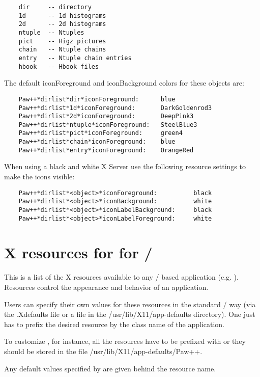 \begin{verbatim}
    dir     -- directory
    1d      -- 1d histograms
    2d      -- 2d histograms
    ntuple  -- Ntuples
    pict    -- Higz pictures
    chain   -- Ntuple chains
    entry   -- Ntuple chain entries
    hbook   -- Hbook files
\end{verbatim}

   The default iconForeground and iconBackground colors for these objects are:

\begin{verbatim}
    Paw++*dirlist*dir*iconForeground:      blue
    Paw++*dirlist*1d*iconForeground:       DarkGoldenrod3
    Paw++*dirlist*2d*iconForeground:       DeepPink3
    Paw++*dirlist*ntuple*iconForeground:   SteelBlue3
    Paw++*dirlist*pict*iconForeground:     green4
    Paw++*dirlist*chain*iconForeground:    blue
    Paw++*dirlist*entry*iconForeground:    OrangeRed
\end{verbatim}

   When using a black and white X Server use the following resource settings
   to make the icons visible:

\begin{verbatim}
    Paw++*dirlist*<object>*iconForeground:          black
    Paw++*dirlist*<object>*iconBackground:          white
    Paw++*dirlist*<object>*iconLabelBackground:     black
    Paw++*dirlist*<object>*iconLabelForeground:     white
\end{verbatim}

\section{X resources for for \KUIP/\MOTIF}

   This is a list of the X resources available to any \KUIP/\MOTIF{} based
   application (e.g. \PAWPP).  Resources control the appearance and behavior of
   an application.

   Users can specify their own values for these resources in the standard
   \Xxi/\MOTIF{} way (via the .Xdefaults file or a file in the
   /usr/lib/X11/app-defaults directory). One just has to prefix the desired
   resource by the class name of the application.

   To customize \PAWPP, for instance, all the resources have to be prefixed
   with  or they should be stored in the file
   /usr/lib/X11/app-defaults/Paw++.

   Any default values specified by \KUIP{} are given behind the resource name.

